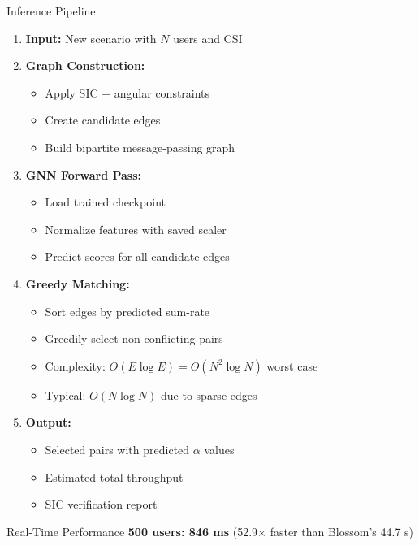 \documentclass[aspectratio=169]{beamer}
\begin{document}
\begin{frame}{Inference Pipeline}
    \begin{enumerate}
        \item \textbf{Input:} New scenario with $N$ users and CSI
        
        \item \textbf{Graph Construction:}
        \begin{itemize}
            \item Apply SIC + angular constraints
            \item Create candidate edges
            \item Build bipartite message-passing graph
        \end{itemize}
        
        \item \textbf{GNN Forward Pass:}
        \begin{itemize}
            \item Load trained checkpoint
            \item Normalize features with saved scaler
            \item Predict scores for all candidate edges
        \end{itemize}
        
        \item \textbf{Greedy Matching:}
        \begin{itemize}
            \item Sort edges by predicted sum-rate
            \item Greedily select non-conflicting pairs
            \item Complexity: $O(E \log E) = O(N^2 \log N)$ worst case
            \item Typical: $O(N \log N)$ due to sparse edges
        \end{itemize}
        
        \item \textbf{Output:}
        \begin{itemize}
            \item Selected pairs with predicted $\alpha$ values
            \item Estimated total throughput
            \item SIC verification report
        \end{itemize}
    \end{enumerate}
    
    \vspace{0.2cm}
    
    \begin{exampleblock}{Real-Time Performance}
        \textbf{500 users: 846 ms} (52.9× faster than Blossom's 44.7 s)
    \end{exampleblock}
\end{frame}
\end{document}
